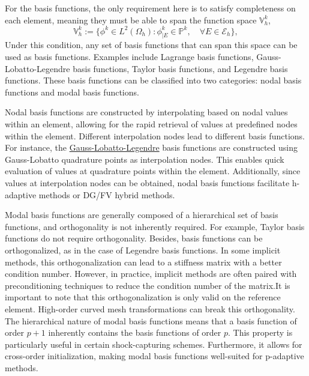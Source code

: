 \documentclass{develop-note}
\begin{document}
For the basis functions, the only requirement here is to satisfy completeness on each element, meaning they must be able to span the function space $\mathbb{V}_{h}^{k}$,
\begin{equation}
  \mathbb{V}_{h}^{k}:=\{\phi^{k}\in L^{2}(\Omega_{h}):\phi^{k}_{|E}\in\mathbb{P}^{k},\quad\forall E\in\mathscr{E}_{h}\},
\end{equation}
Under this condition, any set of basis functions that can span this space can be used as basis functions. Examples include Lagrange basis functions, Gauss-Lobatto-Legendre basis functions, Taylor basis functions, and Legendre basis functions. These basis functions can be classified into two categories: nodal basis functions and modal basis functions.

Nodal basis functions are constructed by interpolating based on nodal values within an element, allowing for the rapid retrieval of values at predefined nodes within the element. Different interpolation nodes lead to different basis functions. For instance, the \href{https://docs.fenicsproject.org/dolfinx/main/python/demos/demo_lagrange_variants.html}{Gauss-Lobatto-Legendre} basis functions are constructed using Gauss-Lobatto quadrature points as interpolation nodes. This enables quick evaluation of values at quadrature points within the element. Additionally, since values at interpolation nodes can be obtained, nodal basis functions facilitate h-adaptive methods or DG/FV hybrid methods.

Modal basis functions are generally composed of a hierarchical set of basis functions, and orthogonality is not inherently required. For example, Taylor basis functions do not require orthogonality. Besides, basis functions can be orthogonalized, as in the case of Legendre basis functions. In some implicit methods, this orthogonalization can lead to a stiffness matrix with a better condition number. However, in practice, implicit methods are often paired with preconditioning techniques to reduce the condition number of the matrix.It is important to note that this orthogonalization is only valid on the reference element. High-order curved mesh transformations can break this orthogonality. The hierarchical nature of modal basis functions means that a basis function of order $p+1$ inherently contains the basis functions of order $p$. This property is particularly useful in certain shock-capturing schemes. Furthermore, it allows for cross-order initialization, making modal basis functions well-suited for p-adaptive methods.
\end{document}
